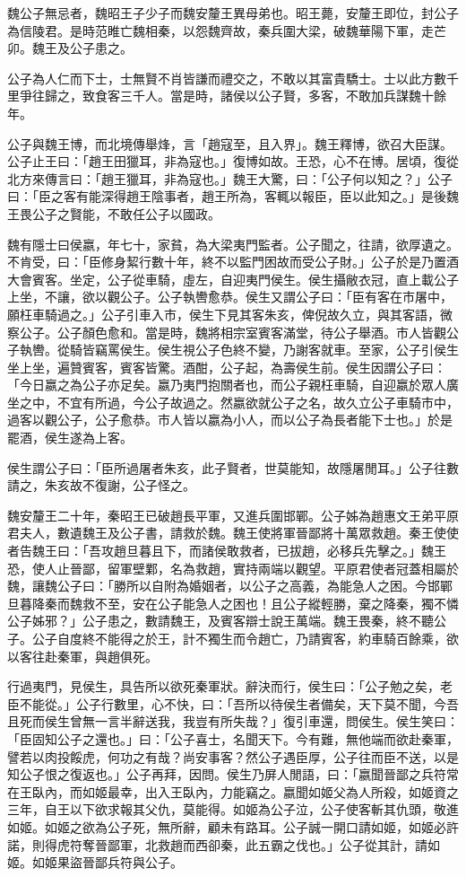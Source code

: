 
\begin{pinyinscope}
魏公子無忌者，魏昭王子少子而魏安釐王異母弟也。昭王薨，安釐王即位，封公子為信陵君。是時范睢亡魏相秦，以怨魏齊故，秦兵圍大梁，破魏華陽下軍，走芒卯。魏王及公子患之。

公子為人仁而下士，士無賢不肖皆謙而禮交之，不敢以其富貴驕士。士以此方數千里爭往歸之，致食客三千人。當是時，諸侯以公子賢，多客，不敢加兵謀魏十餘年。

公子與魏王博，而北境傳舉烽，言「趙寇至，且入界」。魏王釋博，欲召大臣謀。公子止王曰：「趙王田獵耳，非為寇也。」復博如故。王恐，心不在博。居頃，復從北方來傳言曰：「趙王獵耳，非為寇也。」魏王大驚，曰：「公子何以知之？」公子曰：「臣之客有能深得趙王陰事者，趙王所為，客輒以報臣，臣以此知之。」是後魏王畏公子之賢能，不敢任公子以國政。

魏有隱士曰侯嬴，年七十，家貧，為大梁夷門監者。公子聞之，往請，欲厚遺之。不肯受，曰：「臣修身絜行數十年，終不以監門困故而受公子財。」公子於是乃置酒大會賓客。坐定，公子從車騎，虛左，自迎夷門侯生。侯生攝敝衣冠，直上載公子上坐，不讓，欲以觀公子。公子執轡愈恭。侯生又謂公子曰：「臣有客在市屠中，願枉車騎過之。」公子引車入市，侯生下見其客朱亥，俾倪故久立，與其客語，微察公子。公子顏色愈和。當是時，魏將相宗室賓客滿堂，待公子舉酒。市人皆觀公子執轡。從騎皆竊罵侯生。侯生視公子色終不變，乃謝客就車。至家，公子引侯生坐上坐，遍贊賓客，賓客皆驚。酒酣，公子起，為壽侯生前。侯生因謂公子曰：「今日嬴之為公子亦足矣。嬴乃夷門抱關者也，而公子親枉車騎，自迎嬴於眾人廣坐之中，不宜有所過，今公子故過之。然嬴欲就公子之名，故久立公子車騎市中，過客以觀公子，公子愈恭。市人皆以嬴為小人，而以公子為長者能下士也。」於是罷酒，侯生遂為上客。

侯生謂公子曰：「臣所過屠者朱亥，此子賢者，世莫能知，故隱屠閒耳。」公子往數請之，朱亥故不復謝，公子怪之。

魏安釐王二十年，秦昭王已破趙長平軍，又進兵圍邯鄲。公子姊為趙惠文王弟平原君夫人，數遺魏王及公子書，請救於魏。魏王使將軍晉鄙將十萬眾救趙。秦王使使者告魏王曰：「吾攻趙旦暮且下，而諸侯敢救者，已拔趙，必移兵先擊之。」魏王恐，使人止晉鄙，留軍壁鄴，名為救趙，實持兩端以觀望。平原君使者冠蓋相屬於魏，讓魏公子曰：「勝所以自附為婚姻者，以公子之高義，為能急人之困。今邯鄲旦暮降秦而魏救不至，安在公子能急人之困也！且公子縱輕勝，棄之降秦，獨不憐公子姊邪？」公子患之，數請魏王，及賓客辯士說王萬端。魏王畏秦，終不聽公子。公子自度終不能得之於王，計不獨生而令趙亡，乃請賓客，約車騎百餘乘，欲以客往赴秦軍，與趙俱死。

行過夷門，見侯生，具告所以欲死秦軍狀。辭決而行，侯生曰：「公子勉之矣，老臣不能從。」公子行數里，心不快，曰：「吾所以待侯生者備矣，天下莫不聞，今吾且死而侯生曾無一言半辭送我，我豈有所失哉？」復引車還，問侯生。侯生笑曰：「臣固知公子之還也。」曰：「公子喜士，名聞天下。今有難，無他端而欲赴秦軍，譬若以肉投餒虎，何功之有哉？尚安事客？然公子遇臣厚，公子往而臣不送，以是知公子恨之復返也。」公子再拜，因問。侯生乃屏人閒語，曰：「嬴聞晉鄙之兵符常在王臥內，而如姬最幸，出入王臥內，力能竊之。嬴聞如姬父為人所殺，如姬資之三年，自王以下欲求報其父仇，莫能得。如姬為公子泣，公子使客斬其仇頭，敬進如姬。如姬之欲為公子死，無所辭，顧未有路耳。公子誠一開口請如姬，如姬必許諾，則得虎符奪晉鄙軍，北救趙而西卻秦，此五霸之伐也。」公子從其計，請如姬。如姬果盜晉鄙兵符與公子。


\end{pinyinscope}

